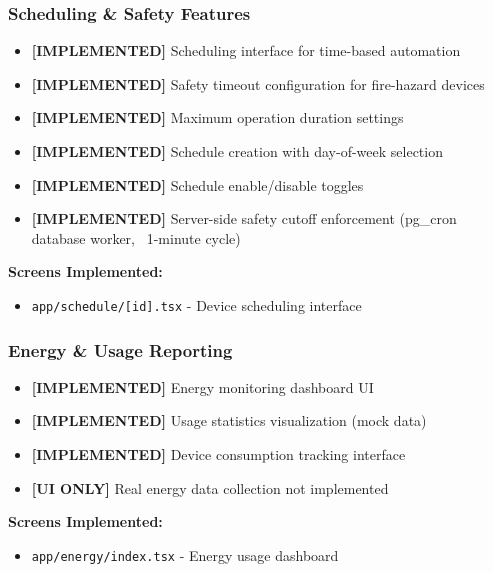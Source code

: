 \documentclass[12pt,a4paper]{article}
\begin{document}
\subsubsection{Scheduling \& Safety Features}
\begin{itemize}[leftmargin=*]
    \item \textcolor{implemented}{\textbf{[IMPLEMENTED]}} Scheduling interface for time-based automation
    \item \textcolor{implemented}{\textbf{[IMPLEMENTED]}} Safety timeout configuration for fire-hazard devices
    \item \textcolor{implemented}{\textbf{[IMPLEMENTED]}} Maximum operation duration settings
    \item \textcolor{implemented}{\textbf{[IMPLEMENTED]}} Schedule creation with day-of-week selection
    \item \textcolor{implemented}{\textbf{[IMPLEMENTED]}} Schedule enable/disable toggles
    \item \textcolor{implemented}{\textbf{[IMPLEMENTED]}} Server-side safety cutoff enforcement (pg\_cron database worker, ~1-minute cycle)
\end{itemize}

\textbf{Screens Implemented:}
\begin{itemize}
    \item \texttt{app/schedule/[id].tsx} - Device scheduling interface
\end{itemize}

\subsubsection{Energy \& Usage Reporting}
\begin{itemize}[leftmargin=*]
    \item \textcolor{implemented}{\textbf{[IMPLEMENTED]}} Energy monitoring dashboard UI
    \item \textcolor{implemented}{\textbf{[IMPLEMENTED]}} Usage statistics visualization (mock data)
    \item \textcolor{implemented}{\textbf{[IMPLEMENTED]}} Device consumption tracking interface
    \item \textcolor{pending}{\textbf{[UI ONLY]}} Real energy data collection not implemented
\end{itemize}

\textbf{Screens Implemented:}
\begin{itemize}
    \item \texttt{app/energy/index.tsx} - Energy usage dashboard
\end{itemize}
\end{document}
